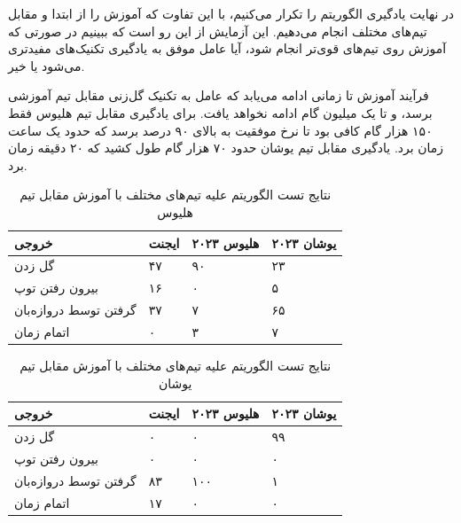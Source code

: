 در نهایت یادگیری الگوریتم  را تکرار می‌کنیم، با این تفاوت که آموزش را از ابتدا و مقابل تیم‌های مختلف انجام می‌دهیم.
این آزمایش از این رو است که ببینیم در صورتی که آموزش روی تیم‌های قوی‌تر انجام شود، آیا عامل موفق به یادگیری تکنیک‌های مفید‌تری می‌شود یا خیر.

فرآیند آموزش تا زمانی ادامه می‌یابد که عامل به تکنیک گل‌زنی مقابل تیم آموزشی برسد، و تا یک میلیون گام ادامه نخواهد یافت.
برای یادگیری مقابل تیم هلیوس فقط ۱۵۰ هزار گام کافی بود تا نرخ موفقیت به بالای ۹۰ درصد برسد که حدود یک ساعت زمان برد. یادگیری مقابل تیم یوشان حدود ۷۰ هزار گام طول کشید که ۲۰ دقیقه زمان برد.


\begin{table}[H]
    \centering
    \caption{نتایج تست الگوریتم  علیه تیم‌های مختلف با آموزش مقابل تیم هلیوس}\label{tab:ddpg_helios_generalization}
    \begin{tabular}{ |p{4cm}|p{3cm}|p{3cm}|p{3cm}|  }
            \hline
            خروجی & ایجنت & هلیوس ۲۰۲۳ & یوشان ۲۰۲۳\\
            \hline
            گل زدن & ۴۷ & ۹۰ & ۲۳ \\
            \hline
            بیرون رفتن توپ & ۱۶ &۰ & ۵ \\
            \hline
            گرفتن توسط دروازه‌بان & ۳۷ &۷ & ۶۵ \\
            \hline
            اتمام زمان & ۰ &۳ & ۷ \\
            \hline
        \end{tabular}
\end{table}

\begin{table}[H]
    \centering
    \caption{نتایج تست الگوریتم  علیه تیم‌های مختلف با آموزش مقابل تیم یوشان}\label{tab:ddpg_yushan_generalization}
        \begin{tabular}{ |p{4cm}|p{3cm}|p{3cm}|p{3cm}|  }
            \hline
            خروجی & ایجنت & هلیوس ۲۰۲۳ & یوشان ۲۰۲۳\\
            \hline
            گل زدن & ۰ & ۰ & ۹۹ \\
            \hline
            بیرون رفتن توپ & ۰ &۰ & ۰ \\
            \hline
            گرفتن توسط دروازه‌بان & ۸۳ &۱۰۰ & ۱ \\
            \hline
            اتمام زمان & ۱۷ &۰ & ۰ \\
            \hline
        \end{tabular}
\end{table}

